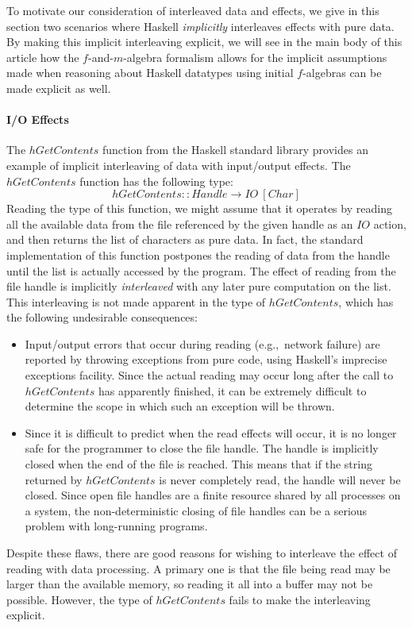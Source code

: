 \documentclass{jfp1}
\begin{document}
To motivate our consideration of interleaved data and effects, we give
in this section two scenarios where Haskell \emph{implicitly}
interleaves effects with pure data. By making this implicit
interleaving explicit, we will see in the main body of this article
how the $f$-and-$m$-algebra formalism allows for the implicit
assumptions made when reasoning about Haskell datatypes using initial
$f$-algebras can be made explicit as well.

\paragraph{I/O Effects}

The $\mathit{hGetContents}$ function from the Haskell standard library
provides an example of implicit interleaving of data with input/output
effects. The $\mathit{hGetContents}$ function has the following type:
\begin{displaymath}
  \mathit{hGetContents} :: \mathit{Handle} \to \mathit{IO}~[\mathit{Char}]
\end{displaymath}
Reading the type of this function, we might assume that it operates by
reading all the available data from the file referenced by the given
handle as an $\mathit{IO}$ action, and then returns the list of
characters as pure data. In fact, the standard implementation of this
function postpones the reading of data from the handle until the list
is actually accessed by the program. The effect of reading from the
file handle is implicitly \emph{interleaved} with any later pure
computation on the list. This interleaving is not made apparent in the
type of $\mathit{hGetContents}$, which has the following undesirable
consequences:
\begin{itemize}
\item Input/output errors that occur during reading (e.g.,~network
  failure) are reported by throwing exceptions from pure code, using
  Haskell's imprecise exceptions facility. Since the actual reading
  may occur long after the call to $\mathit{hGetContents}$ has
  apparently finished, it can be extremely difficult to determine the
  scope in which such an exception will be thrown.
\item Since it is difficult to predict when the read effects will
  occur, it is no longer safe for the programmer to close the file
  handle. The handle is implicitly closed when the end of the file is
  reached. This means that if the string returned by
  $\mathit{hGetContents}$ is never completely read, the handle will
  never be closed. Since open file handles are a finite resource
  shared by all processes on a system, the non-deterministic closing
  of file handles can be a serious problem with long-running programs.
\end{itemize}
Despite these flaws, there are good reasons for wishing to interleave
the effect of reading with data processing. A primary one is that the
file being read may be larger than the available memory, so reading it
all into a buffer may not be possible. However, the type of
$\mathit{hGetContents}$ fails to make the interleaving explicit.
\end{document}
